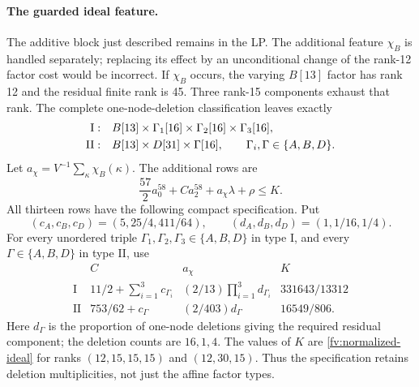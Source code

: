 \paragraph{The guarded ideal feature.}
The additive block just described remains in the LP. The additional
feature $\chi_B$ is handled separately; replacing its effect by an
unconditional change of the rank-12 factor cost would be incorrect.
If $\chi_B$ occurs, the varying $B[13]$ factor has rank 12 and
the residual finite rank is 45. Three rank-15 components exhaust that
rank. The complete one-node-deletion classification leaves exactly
\begin{align}
 \mathrm{I}:&\quad B[13]\times\Gamma_1[16]
                   \times\Gamma_2[16]\times\Gamma_3[16],\notag\\
 \mathrm{II}:&\quad B[13]\times D[31]\times\Gamma[16],
 \qquad\Gamma_i,\Gamma\in\{A,B,D\}.
 \label{fv:guarded-links}
\end{align}
Let $a_\chi=V^{-1}\sum_\kappa\chi_B(\kappa)$. The additional rows are
\begin{equation}\label{fv:guarded-rows}
  \frac{57}{2}a^{58}_0+C a^{58}_2+a_\chi\lambda+\rho\le K.
\end{equation}
All thirteen rows have the following compact specification. Put
\[
 (c_A,c_B,c_D)=(5,25/4,411/64),\qquad
 (d_A,d_B,d_D)=(1,1/16,1/4).
\]
For every unordered triple $\Gamma_1,\Gamma_2,\Gamma_3\in\{A,B,D\}$
in type I, and every $\Gamma\in\{A,B,D\}$ in type II, use
\begin{equation}\label{fv:guarded-data}
\begin{array}{c|ccc}
 &C&a_\chi&K\\\hline
 \mathrm{I}&11/2+\sum_{i=1}^3c_{\Gamma_i}
       &(2/13)\prod_{i=1}^3d_{\Gamma_i}&331643/13312\\
 \mathrm{II}&753/62+c_\Gamma&(2/403)d_\Gamma&16549/806.
\end{array}
\end{equation}
Here $d_\Gamma$ is the proportion of one-node deletions giving the
required residual component; the deletion counts are $16,1,4$.
The values of $K$ are \eqref{fv:normalized-ideal} for ranks
$(12,15,15,15)$ and $(12,30,15)$. Thus the specification retains
deletion multiplicities, not just the affine factor types.

